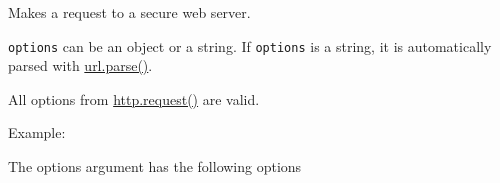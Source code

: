 Makes a request to a secure web server.

\texttt{options} can be an object or a string. If \texttt{options} is a
string, it is automatically parsed with
\href{url.html\#url.parse}{url.parse()}.

All options from
\href{http.html\#http\_http\_request\_options\_callback}{http.request()}
are valid.

Example:

\begin{Shaded}
\begin{Highlighting}[]
 \NormalTok{);}

 
  \NormalTok{: }\NormalTok{,}
  \NormalTok{: }\NormalTok{,}
  \NormalTok{: }\NormalTok{,}
  \NormalTok{: }
\NormalTok{\};}

 
  \NormalTok{(}\NormalTok{, }\NormalTok{);}
  \NormalTok{(}\NormalTok{, }\NormalTok{);}

  \NormalTok{(}\NormalTok{, }
  \NormalTok{\});}
\NormalTok{\});}
\NormalTok{();}

\NormalTok{(}\NormalTok{, }
\NormalTok{\});}
\end{Highlighting}
\end{Shaded}

The options argument has the following options

